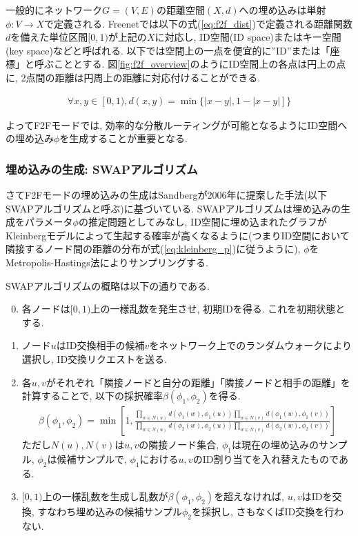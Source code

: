 \documentclass[dvipdfmx]{ampbt}
\begin{document}
   一般的にネットワーク$G=(V,E)$の距離空間$(X,d)$への埋め込みは単射$\phi:V \to X$で定義される\cite{papadimitriou2005conjecture}. Freenetでは以下の式(\ref{eq:f2f_dist})で定義される距離関数$d$を備えた単位区間$[0,1)$が上記の$X$に対応し, ID空間(ID space)またはキー空間(key space)などと呼ばれる. 以下では空間上の一点を便宜的に''ID''または「座標」と呼ぶこととする. 図\ref{fig:f2f_overview}のようにID空間上の各点は円上の点に, 2点間の距離は円周上の距離に対応付けることができる.

   \begin{eqnarray}
    \forall x,y \in [0,1), d(x,y) = \min\{|x-y|, 1 - |x-y|]\} \label{eq:f2f_dist}
   \end{eqnarray}

   よってF2Fモードでは, 効率的な分散ルーティングが可能となるようにID空間への埋め込み$\phi$を生成することが重要となる. 

   \subsubsection{埋め込みの生成: SWAPアルゴリズム}
   さてF2Fモードの埋め込みの生成はSandbergが2006年に提案した手法(以下SWAPアルゴリズムと呼ぶ)に基づいている\cite{sandberg2006distributed}. SWAPアルゴリズムは埋め込みの生成をパラメータ$\phi$の推定問題としてみなし, ID空間に埋め込まれたグラフがKleinbergモデルによって生起する確率が高くなるように(つまりID空間において隣接するノード間の距離の分布が式(\ref{eq:kleinberg_p})に従うように), $\phi$をMetropolis-Hastings法によりサンプリングする.

   SWAPアルゴリズムの概略は以下の通りである. 
   \begin{enumerate}
    \setcounter{enumi}{-1}
    \item 各ノードは$[0,1)$上の一様乱数を発生させ, 初期IDを得る. これを初期状態とする. 
    \item ノード$u$はID交換相手の候補$v$をネットワーク上でのランダムウォークにより選択し, ID交換リクエストを送る.
    \item 各$u,v$がそれぞれ「隣接ノードと自分の距離」「隣接ノードと相手の距離」を計算することで, 以下の採択確率$\beta(\phi_1, \phi_2)$を得る. 
    \begin{eqnarray}
     \beta(\phi_1, \phi_2)= \min \left[1, \frac{\prod_{w \in N(u)}d(\phi_1(w), \phi_1(u))\prod_{w \in N(v)}d(\phi_1(w), \phi_1(v))}{\prod_{w \in N(u)}d(\phi_2(w), \phi_2(u))\prod_{w \in N(v)}d(\phi_2(w), \phi_2(v))}\right] \label{eq:acceptance}
    \end{eqnarray}
	  ただし$N(u), N(v)$は$u,v$の隣接ノード集合, $\phi_1$は現在の埋め込みのサンプル, $\phi_2$は候補サンプルで, $\phi_1$における$u,v$のID割り当てを入れ替えたものである.
    \item $[0,1)$上の一様乱数を生成し乱数が$\beta(\phi_1, \phi_2)$を超えなければ, $u,v$はIDを交換, すなわち埋め込みの候補サンプル$\phi_2$を採択し, さもなくばID交換を行わない.
   \end{enumerate}
\end{document}
